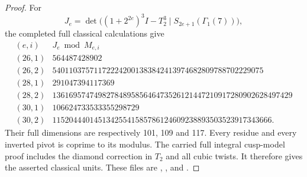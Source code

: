 \begin{proof}
For
\[
 J_e=\det\bigl((1+2^{2e})^3I-T_2^3\mid
                         S_{2e+1}(\Gamma_1(7))\bigr),
\]
the completed full classical calculations give
\[
\begin{array}{c|r}
(e,i)&J_e\bmod M_{e,i}\\\hline
(26,1)&564487428902\\
(26,2)&540110375711722242001383842413974682809788702229075\\
(28,1)&291047394117369\\
(28,2)&1361695747498278489585646473526121447210917280902628497429\\
(30,1)&106624733533355298729\\
(30,2)&11520444014513425541585786124609238893503523917343666.
\end{array}                                             \tag{KT-H.5}
\]
Their full dimensions are respectively 101, 109 and 117.
Every residue and every inverted pivot is coprime to its modulus.
The carried full integral cusp-model proof includes the diamond
correction in $T_2$ and all cubic twists.  It therefore gives the
asserted classical units.  These files are
,
, and
.
\end{proof}

